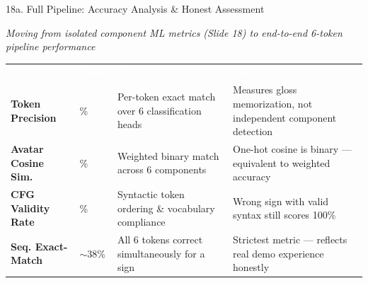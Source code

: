 \documentclass[aspectratio=169]{beamer}
\begin{document}
\begin{frame}[t]{18a. Full Pipeline: Accuracy Analysis \& Honest Assessment}
\vspace{-0.1cm}
\begin{center}
{\scriptsize\textit{Moving from isolated component ML metrics (Slide 18) to end-to-end 6-token pipeline performance}}
\end{center}

\vspace{0.05cm}

\begin{center}
\setlength{\tabcolsep}{3pt}
\renewcommand{\arraystretch}{1.25}
{\fontsize{5.8pt}{7.5pt}\selectfont
\begin{tabular}{
    >{\raggedright\arraybackslash\bfseries}m{2.2cm}
    >{\centering\arraybackslash}m{1.1cm}
    >{\raggedright\arraybackslash}m{4.0cm}
    >{\raggedright\arraybackslash}m{4.5cm}
}
\rowcolor{maroon}
\centering\arraybackslash\textcolor{white}{\textbf{Metric}} &
\textcolor{white}{\textbf{Value}} &
\centering\arraybackslash\textcolor{white}{\textbf{What It Measures}} &
\centering\arraybackslash\textcolor{white}{\textbf{Limitation}} \\

\rowcolor{lightgreen}
Token Precision & 85.49\% & Per-token exact match over 6 classification heads & Measures gloss memorization, not independent component detection \\

\rowcolor{lightblue}
Avatar Cosine Sim. & 88.12\% & Weighted binary match across 6 components & One-hot cosine is binary --- equivalent to weighted accuracy \\

\rowcolor{lightcyan}
CFG Validity Rate & 100\% & Syntactic token ordering \& vocabulary compliance & Wrong sign with valid syntax still scores 100\% \\

\rowcolor{lightorange}
Seq. Exact-Match & $\sim$38\% & All 6 tokens correct simultaneously for a sign & Strictest metric --- reflects real demo experience honestly \\
\end{tabular}
}
\end{center}

\vspace{0.1cm}


\end{frame}
\end{document}
